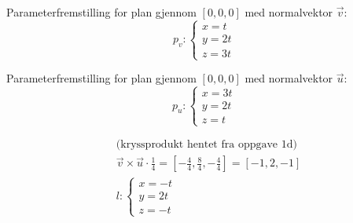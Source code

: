 \documentclass[norsk,11pt,a4paper]{report}
\newcommand{\oppgaveDel}[1]{\item[#1)]}
\newcommand{\m}{\cdot}
\begin{document}
\oppgaveDel{e}
Parameterfremstilling for plan gjennom $[0,0,0]$ med normalvektor $\vec{v}$:\\

\begin{equation*}
p_v:\begin{cases}
x=t\\
y=2t\\
z=3t
\end{cases}
\end{equation*}

Parameterfremstilling for plan gjennom $[0,0,0]$ med normalvektor $\vec{u}$:
\begin{equation*}
p_u:\begin{cases}
x=3t\\
y=2t\\
z=t
\end{cases}
\end{equation*}

\oppgaveDel{f}
\begin{align*}
&\text{(kryssprodukt hentet fra oppgave 1d)}\\
&\vec{v} \times \vec{u} \m \frac{1}{4}= [-\frac{4}{4},\frac{8}{4},-\frac{4}{4}] = [-1,2,-1]\\[0.2cm]
&l:\begin{cases}x=-t\\y=2t\\z=-t\end{cases}
\end{align*}
\end{document}
